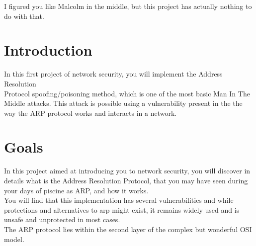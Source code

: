 \documentclass{42-en}
\begin{document}
    I figured you like Malcolm in the middle, but this project has actually nothing to do with that.\\
    \newpage
    
\chapter{Introduction}

    In this first project of network security, 
     you will implement the Address Resolution\\
     Protocol spoofing/poisoning method, which is one of the most basic Man In The Middle attacks. 
     This attack is possible using a vulnerability present in the the way the ARP protocol works and interacts in a network.



\chapter{Goals}

    In this project aimed at introducing you to network security,
    you will discover in details what is the Address Resolution Protocol,
    that you may have seen during your days of piscine as ARP, and how it 
    works.\\
    You will find that this implementation has several vulnerabilities 
    and while protections and alternatives to arp might exist,
    it remains widely used and is unsafe and unprotected in most cases.\\
    The ARP protocol lies within the second layer of the complex but wonderful OSI model.

\end{document}
